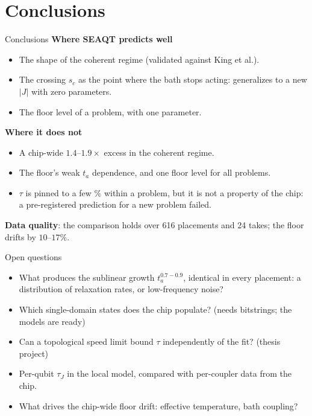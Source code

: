 \documentclass[aspectratio=169,11pt]{beamer}
\begin{document}
\section{Conclusions}

\begin{frame}{Conclusions}
  \textbf{Where SEAQT predicts well}
  \begin{itemize}
    \item The shape of the coherent regime (validated against King et al.).
    \item The crossing $s_c$ as the point where the bath stops acting: generalizes to a new $|J|$ with zero parameters.
    \item The floor level of a problem, with one parameter.
  \end{itemize}
  \textbf{Where it does not}
  \begin{itemize}
    \item A chip-wide $1.4$--$1.9\times$ excess in the coherent regime.
    \item The floor's weak $t_a$ dependence, and one floor level for all problems.
    \item $\tau$ is pinned to a few \% within a problem, but it is not a property of the chip: a pre-registered
          prediction for a new problem failed.
  \end{itemize}
  \textbf{Data quality}: the comparison holds over 616 placements and 24 takes; the floor drifts by $10$--$17\%$.
\end{frame}

\begin{frame}{Open questions}
  \begin{itemize}
    \item What produces the sublinear growth $t_a^{0.7-0.9}$, identical in every placement: a distribution of
          relaxation rates, or low-frequency noise?
    \item Which single-domain states does the chip populate? (needs bitstrings; the models are ready)
    \item Can a topological speed limit bound $\tau$ independently of the fit? (thesis project)
    \item Per-qubit $\tau_J$ in the local model, compared with per-coupler data from the chip.
    \item What drives the chip-wide floor drift: effective temperature, bath coupling?
  \end{itemize}
\end{frame}
\end{document}
